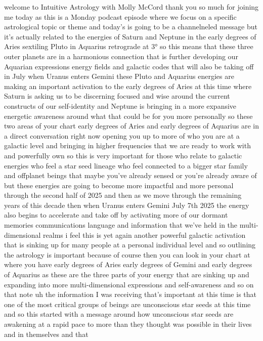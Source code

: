 \documentclass{article}
\begin{document}
welcome to Intuitive Astrology with Molly McCord thank you so much for
joining me today as this is a Monday podcast episode where we focus on a
specific astrological topic or theme and today's is going to be a
channelneled message but it's actually related to the energies of Saturn
and Neptune in the early degrees of Aries sextiling Pluto in Aquarius
retrograde at 3° so this means that these three outer planets are in a
harmonious connection that is further developing our Aquarian
expressions energy fields and galactic codes that will also be taking
off in July when Uranus enters Gemini these Pluto and Aquarius energies
are making an important activation to the early degrees of Aries at this
time where Saturn is asking us to be discerning focused and wise around
the current constructs of our self-identity and Neptune is bringing in a
more expansive energetic awareness around what that could be for you
more personally so these two areas of your chart early degrees of Aries
and early degrees of Aquarius are in a direct conversation right now
opening you up to more of who you are at a galactic level and bringing
in higher frequencies that we are ready to work with and powerfully own
so this is very important for those who relate to galactic energies who
feel a star seed lineage who feel connected to a bigger star family and
offplanet beings that maybe you've already sensed or you're already
aware of but these energies are going to become more impactful and more
personal through the second half of 2025 and then as we move through the
remaining years of this decade then when Uranus enters Gemini July 7th
2025 the energy also begins to accelerate and take off by activating
more of our dormant memories communications language and information
that we've held in the multi-dimensional realms i feel this is yet again
another powerful galactic activation that is sinking up for many people
at a personal individual level and so outlining the astrology is
important because of course then you can look in your chart at where you
have early degrees of Aries early degrees of Gemini and early degrees of
Aquarius as these are the three parts of your energy that are sinking up
and expanding into more multi-dimensional expressions and self-awareness
and so on that note uh the information I was receiving that's important
at this time is that one of the most critical groups of beings are
unconscious star seeds at this time and so this started with a message
around how unconscious star seeds are awakening at a rapid pace to more
than they thought was possible in their lives and in themselves and that
\end{document}

